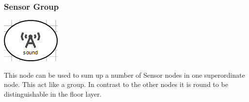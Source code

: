 \subsubsection{Sensor Group}
\noindent\begin{minipage}{0.15\textwidth}%
	\includegraphics[width=\linewidth]{assets/images/group}
\end{minipage}%
\hfill%
\begin{minipage}{0.8\textwidth}
	This node can be used to sum up a number of Sensor nodes in one superordinate node. This act like a group. In contrast to the other nodes it is round to be distinguishable in the floor layer.
\end{minipage}

